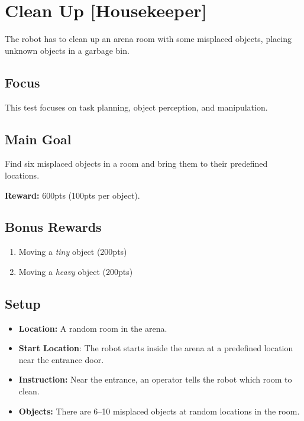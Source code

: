 \section{Clean Up [Housekeeper]}
\label{test:clean-up}

The robot has to clean up an arena room with some misplaced objects, placing unknown objects in a garbage bin.

\subsection*{Focus}
This test focuses on task planning, object perception, and manipulation.

\subsection*{Main Goal}
Find six misplaced objects in a room and bring them to their predefined locations.

\noindent\textbf{Reward:} 600pts (100pts per object).

\subsection*{Bonus Rewards}
\begin{enumerate}[nosep]
	\item Moving a \emph{tiny} object (200pts)
	\item Moving a \emph{heavy} object (200pts)
\end{enumerate}


\subsection*{Setup}
\begin{itemize}[nosep]
	\item \textbf{Location:} A random room in the arena.
	\item \textbf{Start Location}: The robot starts inside the arena at a predefined location near the entrance door.
	\item \textbf{Instruction:} Near the entrance, an operator tells the robot which room to clean.
	\item \textbf{Objects:} There are 6--10 misplaced objects at random locations in the room.
\end{itemize}

